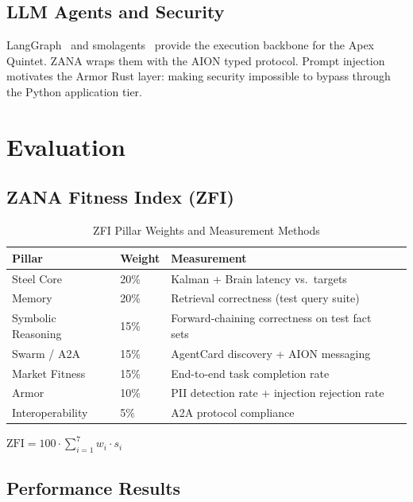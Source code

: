 \documentclass[12pt,a4paper]{article}
\begin{document}
\subsection{LLM Agents and Security}
LangGraph~\cite{langchain2024langgraph} and smolagents~\cite{huggingface2024smolagents} provide the
execution backbone for the Apex Quintet. ZANA wraps them with the AION typed protocol. Prompt
injection~\cite{greshake2023promptinjection} motivates the Armor Rust layer: making security
impossible to bypass through the Python application tier.

\section{Evaluation}

\subsection{ZANA Fitness Index (ZFI)}

\begin{table}[H]
\centering
\caption{ZFI Pillar Weights and Measurement Methods}
\begin{tabular}{@{}llll@{}}
\toprule
\textbf{Pillar} & \textbf{Weight} & \textbf{Measurement} \\
\midrule
Steel Core     & 20\% & Kalman + Brain latency vs.\ targets \\
Memory         & 20\% & Retrieval correctness (test query suite) \\
Symbolic Reasoning & 15\% & Forward-chaining correctness on test fact sets \\
Swarm / A2A    & 15\% & AgentCard discovery + AION messaging \\
Market Fitness & 15\% & End-to-end task completion rate \\
Armor          & 10\% & PII detection rate + injection rejection rate \\
Interoperability & 5\% & A2A protocol compliance \\
\bottomrule
\end{tabular}
$\displaystyle\mathrm{ZFI} = 100 \cdot \sum_{i=1}^{7} w_i \cdot s_i$
\end{table}

\subsection{Performance Results}
\end{document}
